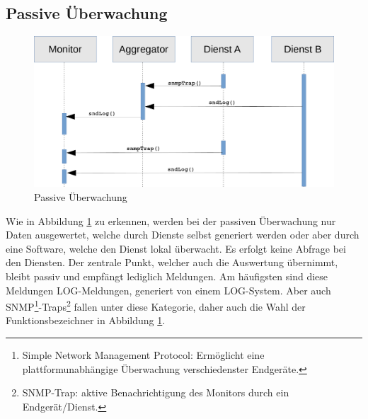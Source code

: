 \subsection{Passive Überwachung}
\begin{figure}[htbp]
    \caption{Passive Überwachung}
    \label{passiv}\vspace{0.2cm}
    \centering
    \includegraphics[scale=0.36]{img/sequence_uml_passive_trans}

\end{figure}

Wie in Abbildung \ref{passiv} zu erkennen, werden bei der passiven Überwachung nur Daten
ausgewertet, welche durch Dienste selbst generiert werden oder aber durch eine Software, 
welche den Dienst lokal überwacht. Es erfolgt keine Abfrage bei den Diensten. Der 
zentrale Punkt, welcher auch die Auswertung übernimmt, bleibt passiv und empfängt 
lediglich Meldungen. Am häufigsten sind diese Meldungen LOG-Meldungen, generiert von 
einem LOG-System. Aber auch SNMP\footnote{Simple Network Management Protocol: 
Ermöglicht eine plattformunabhängige Überwachung verschiedenster 
Endgeräte.}-Traps\footnote{SNMP-Trap: aktive Benachrichtigung des Monitors durch ein 
Endgerät/Dienst.} fallen unter diese Kategorie, daher auch die Wahl der 
Funktionsbezeichner in Abbildung \ref{passiv}.
